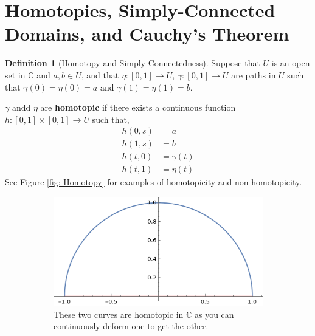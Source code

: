 \documentclass[a4paper, 12pt]{article}
\theoremstyle{definition}
\newtheorem{definition}{Definition}
\numberwithin{theorem}{section}
\numberwithin{definition}{section}
\numberwithin{exercise}{section}
\numberwithin{remark}{section}
\numberwithin{figure}{section}
\numberwithin{example}{section}
\newcommand{\C}{\mathbb{C}}
\begin{document}
\section{Homotopies, Simply-Connected Domains, and Cauchy's Theorem}
\begin{definition}[Homotopy and Simply-Connectedness]
    Suppose that $U$ is an open set in $\C$ and $a,b\in U$,
    and that $\eta:\left[ 0,1 \right] \rightarrow U$,
    $\gamma:\left[ 0,1 \right] \rightarrow U$ are paths in $U$
    such that $\gamma(0) = \eta(0) = a$ and $\gamma(1) = \eta(1) = b$.

    $\gamma$ andd $\eta$ are \textbf{homotopic} if there exists a continuous function $h:\left[ 0,1 \right] \times \left[ 0,1 \right] \rightarrow U$ such that,
    \begin{align*}
        h(0,s) &= a \\
        h(1,s) &= b \\
        h(t,0) &= \gamma(t) \\
        h(t,1) &= \eta(t)
    \end{align*}
    See Figure \ref{fig: Homotopy} for examples of homotopicity and non-homotopicity.
    \begin{figure}[h]
        \centering
        \begin{subfigure}[b]{0.5\textwidth}
            \centering
            \includegraphics[width=\textwidth]{homotopy1}
            \caption{These two curves are homotopic in $\C$ as you can continuously deform one to get the other.}
        \end{subfigure}
        \hfill
        \centering
        \begin{subfigure}[b]{0.5\textwidth}
            \centering

\end{subfigure}
\end{figure}
\end{definition}
\end{document}
